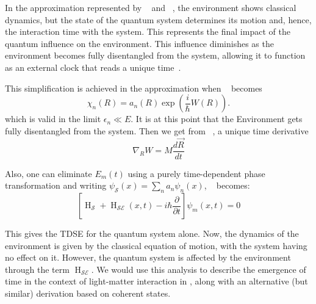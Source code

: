 In the approximation represented by ~ and
~, the environment shows classical dynamics, but
the state of the quantum system determines its motion and, hence, the interaction time with the system. This represents the final impact of the quantum influence on the environment. This influence diminishes as the environment becomes fully disentangled
from the system, allowing it to function as an external clock that reads a unique time~\cite{briggs2001derivation}.

This simplification is achieved in the approximation when ~ becomes
\begin{equation}
    \label{eqn:chap2_clc_action2}
    \chi_n(R) = a_n(R) \exp\left(\frac{i}{\hbar} W(R)\right).
\end{equation}
which is valid  in the limit \(\epsilon_n \ll E\). It is at this point that the Environment gets fully disentangled from the system. Then we get from ~, a unique time derivative
\begin{equation}
    \label{eqn:chap2_clc_action3}
    \nabla_R W = M \dfrac{d \vec{R}}{dt}
\end{equation}

Also, one can eliminate \(E_m(t)\) using a purely time-dependent phase transformation and writing 
\(\psi_{\mathcal{S}}(x) = \sum_{n}a_n \psi_n(x)\), ~ becomes:
\begin{equation}
    \label{eqn:chap2_system_evol_mod4}
     \left[
    \operatorname{H}_{\mathcal{S}} + \operatorname{H}_{\mathcal{SE}}(x, t)- i \hbar \dfrac{\partial}{\partial t} \right] 
    \psi_m (x,t)= 0
\end{equation}

This gives the TDSE for the quantum system alone. Now, the dynamics of the environment is given by the classical equation of motion, with the system having no effect on it. However, the quantum system is affected by the environment
through the term \(\operatorname{H}_{\mathcal{SE}}\). We would use this analysis to describe the 
emergence of time in the context of light-matter interaction in , 
along with an alternative (but similar) derivation based on coherent states. 